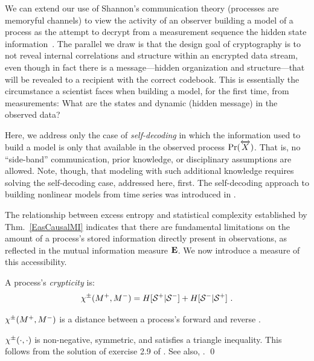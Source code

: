 We can extend our use of Shannon's communication theory (processes are memoryful
channels) to view the activity of an observer building a model of a process as
the attempt to decrypt from a measurement sequence the hidden state 
information~\cite{Shan49a}. The parallel we draw is that the design goal of 
cryptography is to not reveal internal correlations and structure within an 
encrypted data stream, even though in fact there is a message---hidden 
organization and structure---that will be revealed to a recipient with the 
correct codebook. This is essentially the circumstance a scientist faces when 
building a model, for the first time, from measurements: What are the states 
and dynamic (hidden message) in the observed data?

Here, we address only the case of \emph{self-decoding} in which the information
used to build a model is only that available in the observed process
$\Pr(\overleftrightarrow {{X}})$. That is, no ``side-band'' communication, prior knowledge,
or disciplinary assumptions are allowed. Note, though, that modeling with such
additional knowledge requires solving the self-decoding case, addressed here,
first. The self-decoding approach to building nonlinear models from time series
was introduced in .

The relationship between excess entropy and statistical complexity established
by Thm.~\ref{EasCausalMI} indicates that there are fundamental limitations on
the amount of a process's stored information directly present in
observations, as reflected in the mutual information measure ${\bf E}$.
We now introduce a measure of this accessibility.

\begin{Def} A process's \emph{crypticity} is:
\begin{equation}
\chi^\pm({M}^{+},{M}^{-}) =
	H[{\mathcal{S}}^{+}|{\mathcal{S}}^{-}]
	+ H[{\mathcal{S}}^{-}|{\mathcal{S}}^{+}] ~.
\end{equation}
\end{Def}

\begin{Prop}
$\chi^\pm({M}^{+},{M}^{-})$ is a distance between a process's forward and
reverse \eMs.
\label{Prop:PCisaDistance}
\end{Prop}

\begin{ProProp}
$\chi^\pm(\cdot,\cdot)$ is non-negative, symmetric, and satisfies a triangle
inequality. This follows from the solution of exercise 2.9 of .
See also, .
\qed
\end{ProProp}

